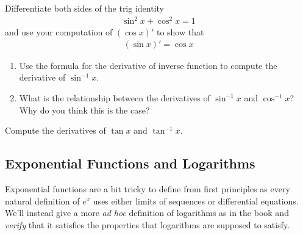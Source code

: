 \begin{exercise}
	Differentiate both sides of the trig identity
	\begin{align*}
		\sin^2 x  + \cos^2 x = 1
	\end{align*}
	and use your computation of $(\cos x)'$ to show that
	\begin{align*}
		(\sin x)' = \cos x
	\end{align*}
\end{exercise}

\begin{exercise}
	\begin{enumerate}
		\item Use the formula for the derivative of inverse function to compute the derivative of $\sin ^{-1}x$.
		\item What is the relationship between the derivatives of $\sin ^{-1}x$ and $\cos ^{-1}x$? Why do you think this is the case?
	\end{enumerate}
\end{exercise}

\begin{exercise}
	Compute the derivatives of $\tan x$ and $\tan^{-1} x$.
\end{exercise}


\subsection{Exponential Functions and Logarithms}
Exponential functions are a bit tricky to define from first principles as every natural definition of $e^x$ uses either limits of sequences or differential equations.
We'll instead give a more {\it ad hoc} definition of logarithms as in the book and {\it verify} that it satisfies the properties that logarithms are supposed to satisfy.

